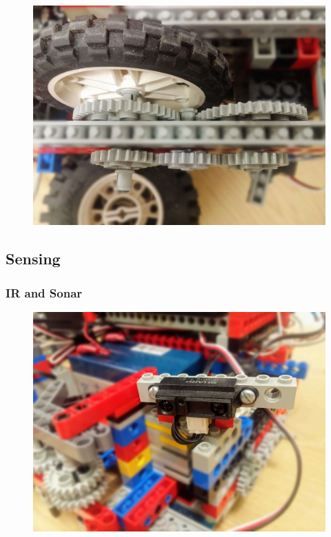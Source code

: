 \begin{figure}[ht]
    \centering
    \includegraphics[width=0.7\linewidth]{res/robot-pics/gear-train-mounted.jpg}
    \caption{}
    \label{fig:}
\end{figure}


\subsection{Sensing}

\subsubsection{IR and Sonar}

\begin{figure}[ht]
    \centering
    \includegraphics[width=0.7\linewidth]{res/robot-pics/ir-sensor-placement.jpg}
    \caption{}
    \label{fig:}
\end{figure}

